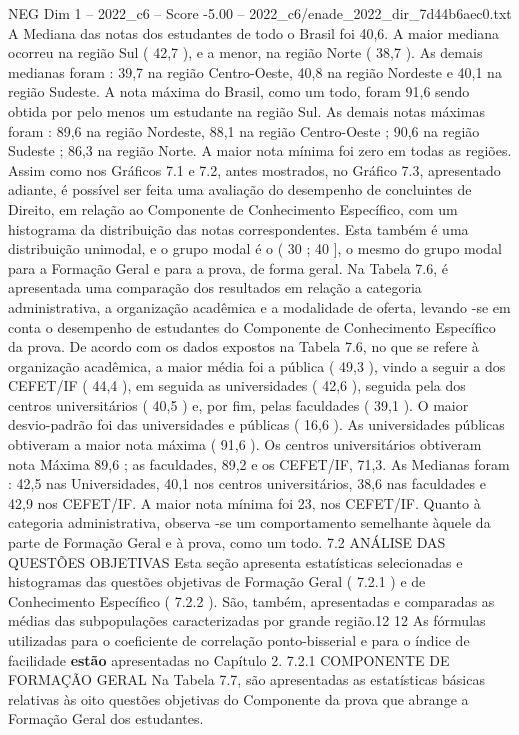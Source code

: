 \begin{textsample}{NEG Dim 1 – 2022\_c6 – Score -5.00 – 2022\_c6/enade\_2022\_dir\_7d44b6aec0.txt}
A Mediana das notas dos estudantes de todo o Brasil foi 40,6.
A maior mediana ocorreu na região Sul ( 42,7 ), e a menor, na região Norte ( 38,7 ).
As demais medianas foram : 39,7 na região Centro-Oeste, 40,8 na região Nordeste e 40,1 na região Sudeste.
A nota máxima do Brasil, como um todo, foram 91,6 sendo obtida por pelo menos um estudante na região Sul.
As demais notas máximas foram : 89,6 na região Nordeste, 88,1 na região Centro-Oeste ; 90,6 na região Sudeste ; 86,3 na região Norte.
A maior nota mínima foi zero em todas as regiões.
Assim como nos Gráficos 7.1 e 7.2, antes mostrados, no Gráfico 7.3, apresentado adiante, é possível ser feita uma avaliação do desempenho de concluintes de Direito, em relação ao Componente de Conhecimento Específico, com um histograma da distribuição das notas correspondentes.
Esta também é uma distribuição unimodal, e o grupo modal é o ( 30 ; 40 ], o mesmo do grupo modal para a Formação Geral e para a prova, de forma geral.
Na Tabela 7.6, é apresentada uma comparação dos resultados em relação a categoria administrativa, a organização acadêmica e a modalidade de oferta, levando -se em conta o desempenho de estudantes do Componente de Conhecimento Específico da prova.
De acordo com os dados expostos na Tabela 7.6, no que se refere à organização acadêmica, a maior média foi a pública ( 49,3 ), vindo a seguir a dos CEFET/IF ( 44,4 ), em seguida as universidades ( 42,6 ), seguida pela dos centros universitários ( 40,5 ) e, por fim, pelas faculdades ( 39,1 ).
O maior desvio-padrão foi das universidades e públicas ( 16,6 ).
As universidades públicas obtiveram a maior nota máxima ( 91,6 ).
Os centros universitários obtiveram nota Máxima 89,6 ; as faculdades, 89,2 e os CEFET/IF, 71,3.
As Medianas foram : 42,5 nas Universidades, 40,1 nos centros universitários, 38,6 nas faculdades e 42,9 nos CEFET/IF.
A maior nota mínima foi 23, nos CEFET/IF.
Quanto à categoria administrativa, observa -se um comportamento semelhante àquele da parte de Formação Geral e à prova, como um todo. 7.2 ANÁLISE DAS QUESTÕES OBJETIVAS Esta seção apresenta estatísticas selecionadas e histogramas das questões objetivas de Formação Geral ( 7.2.1 ) e de Conhecimento Específico ( 7.2.2 ).
São, também, apresentadas e comparadas as médias das subpopulações caracterizadas por grande região.12 12 As fórmulas utilizadas para o coeficiente de correlação ponto-bisserial e para o índice de facilidade \textbf{estão} apresentadas no Capítulo 2. 7.2.1 COMPONENTE DE FORMAÇÃO GERAL Na Tabela 7.7, são apresentadas as estatísticas básicas relativas às oito questões objetivas do Componente da prova que abrange a Formação Geral dos estudantes.

\end{textsample}
